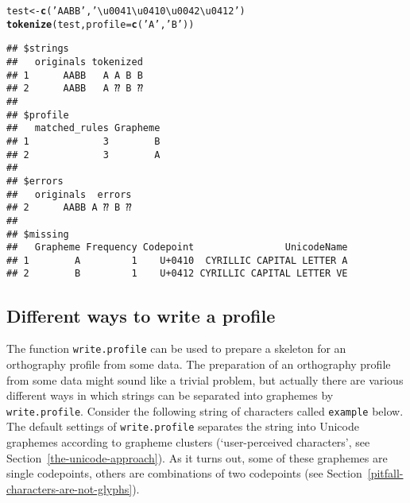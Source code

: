 \documentclass[output=inprep,
		biblatex
		]{LSP/langsci}\usepackage[]{graphicx}\usepackage[]{color}
\makeatletter
\newcommand{\hlstr}[1]{\textcolor[rgb]{0.192,0.494,0.8}{#1}}%
\newcommand{\hlstd}[1]{\textcolor[rgb]{0.345,0.345,0.345}{#1}}%
\newcommand{\hlkwb}[1]{\textcolor[rgb]{0.69,0.353,0.396}{#1}}%
\newcommand{\hlkwc}[1]{\textcolor[rgb]{0.333,0.667,0.333}{#1}}%
\newcommand{\hlkwd}[1]{\textcolor[rgb]{0.737,0.353,0.396}{\textbf{#1}}}%
\newenvironment{kframe}{%
 \def\at@end@of@kframe{}%
 \ifinner\ifhmode%
  \def\at@end@of@kframe{\end{minipage}}%
  \begin{minipage}{\columnwidth}%
 \fi\fi%
 \def\FrameCommand##1{\hskip\@totalleftmargin \hskip-\fboxsep
 \colorbox{shadecolor}{##1}\hskip-\fboxsep
     \hskip-\linewidth \hskip-\@totalleftmargin \hskip\columnwidth}%
 \MakeFramed {\advance\hsize-\width
   \@totalleftmargin\z@ \linewidth\hsize
   \@setminipage}}%
 {\par\unskip\endMakeFramed%
 \at@end@of@kframe}
\newenvironment{knitrout}{}{} %
\makeatother
\begin{document}
\begin{knitrout}\footnotesize
{}\color{fgcolor}\begin{kframe}
\begin{alltt}
\hlstd{test} \hlkwb{<-} \hlkwd{c}\hlstd{(}\hlstr{'AABB'}\hlstd{,} \hlstr{'\textbackslash{}u0041\textbackslash{}u0410\textbackslash{}u0042\textbackslash{}u0412'}\hlstd{)}
\hlkwd{tokenize}\hlstd{( test,} \hlkwc{profile} \hlstd{=} \hlkwd{c}\hlstd{(}\hlstr{'A'}\hlstd{,} \hlstr{'B'}\hlstd{) )}
\end{alltt}


{\ttfamily\noindent{}}\begin{verbatim}
## $strings
##   originals tokenized
## 1      AABB   A A B B
## 2      AАBВ   A ⁇ B ⁇
## 
## $profile
##   matched_rules Grapheme
## 1             3        B
## 2             3        A
## 
## $errors
##   originals  errors
## 2      AАBВ A ⁇ B ⁇
## 
## $missing
##   Grapheme Frequency Codepoint                UnicodeName
## 1        А         1    U+0410  CYRILLIC CAPITAL LETTER A
## 2        В         1    U+0412 CYRILLIC CAPITAL LETTER VE
\end{verbatim}
\end{kframe}
\end{knitrout}

\subsection*{Different ways to write a profile}
\label{write-profile}

The function \texttt{write.profile} can be used to prepare a skeleton for an
orthography profile from some data. The preparation of an orthography profile
from some data might sound like a trivial problem, but actually there are
various different ways in which strings can be separated into graphemes by
\texttt{write.profile}. Consider the following string of characters called
\texttt{example} below. The default settings of \texttt{write.profile} separates
the string into Unicode graphemes according to grapheme clusters
(`user-perceived characters', see Section~\ref{the-unicode-approach}). As it 
turns out, some of these graphemes are single codepoints, others are combinations
of two codepoints (see Section~\ref{pitfall-characters-are-not-glyphs}).
\end{document}
